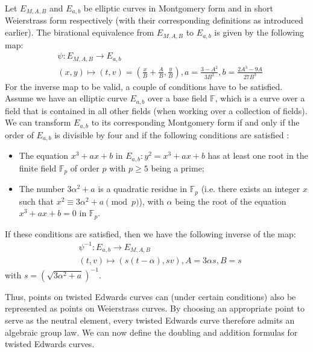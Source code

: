 %
\begin{theorem}
	Let $E_{M,A,B}$ and $E_{a,b}$ be elliptic curves in Montgomery form and in short Weierstrass form respectively (with their corresponding definitions as introduced earlier).
	The birational equivalence from $E_{M,A,B}$ to $E_{a,b}$ is given by the following map:
	\begin{align*}
	& \psi : E_{M,A,B} \to E_{a, b} \\
	& (x, y) \mapsto (t,v) = \left( \frac{x}{B} + \frac{A}{B}, \frac{y}{B} \right), a = \frac{3 - A^2}{3B^2}, b = \frac{2A^3 - 9A}{27B^3}
	\end{align*}
	For the inverse map to be valid, a couple of conditions have to be satisfied.
	Assume we have an elliptic curve $E_{a,b}$ over a base field $\mathbb{F}$, which is a curve over a field that is contained in all other fields (when working over a collection of fields).
	We can transform $E_{a,b}$ to its corresponding Montgomery form if and only if the order of $E_{a,b}$ is divisible by four and if the following conditions are satisfied \cite{okeya2000elliptic}:
	\begin{itemize}
		\item The equation $x^3 + ax + b$ in $E_{a,b} : y^2 = x^3 + ax + b$ has at least one root in the finite field $\mathbb{F}_p$ of order $p$ with $p \ge 5$ being a prime;
		
		\item The number $3\alpha^2 + a$ is a quadratic residue in $\mathbb{F}_p$ (i.e. there exists an integer $x$ such that  $x^2 \equiv 3\alpha^2 + a \pmod{p}$), with $\alpha$ being the root of the equation $x^3 + ax + b = 0$ in $\mathbb{F}_p$.
	\end{itemize}
	If these conditions are satisfied, then we have the following inverse of the map:
	\begin{align*}
	& \psi^{-1} : E_{a, b} \to E_{M,A,B}  \\
	&  (t,v) \mapsto (s(t - \alpha), sv), A = 3 \alpha s, B = s
	\end{align*}
	with $s = \left( \sqrt{3 \alpha^2 + a} \right)^{-1}$.
\end{theorem}
%
Thus, points on twisted Edwards curves can (under certain conditions) also be represented as points on Weierstrass curves. 
By choosing an appropriate point to serve as the neutral element, every twisted Edwards curve therefore admits an algebraic group law. We can now define the doubling and addition formulas for twisted Edwards curves.
